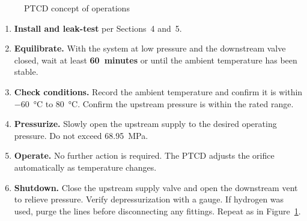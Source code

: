 \documentclass[12pt, letterpaper]{report}%
\begin{document}
\begin{appendices}
\begin{figure}[htbp]
		\caption{PTCD concept of operations}
		\label{fig:ug_conops}
	\end{figure}

	\begin{enumerate}[leftmargin=1.8em, itemsep=6pt]

		\item \textbf{Install and leak-test} per Sections~4 and~5.

		\item \textbf{Equilibrate.} With the system at low pressure and the downstream valve closed, wait at least \textbf{60~minutes} or until the ambient temperature has been stable.

		\item \textbf{Check conditions.} Record the ambient temperature and confirm it is within \SI{-60}{\degreeCelsius} to \SI{+80}{\degreeCelsius}. Confirm the upstream pressure is within the rated range.

		\item \textbf{Pressurize.} Slowly open the upstream supply to the desired operating pressure. Do not exceed \SI{68.95}{\mega\pascal}.

		\item \textbf{Operate.} No further action is required. The PTCD adjusts the orifice automatically as temperature changes.

		\item \textbf{Shutdown.} Close the upstream supply valve and open the downstream vent to relieve pressure. Verify depressurization with a gauge. If hydrogen was used, purge the lines before disconnecting any fittings. Repeat as in Figure~\ref{fig:ug_conops}.

	\end{enumerate}



\end{appendices}
\end{document}
